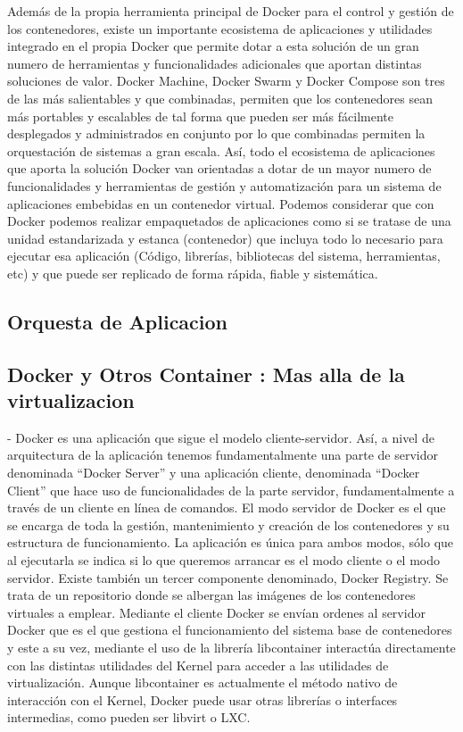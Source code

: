 \documentclass[%
 reprint,
 amsmath,amssymb,
 aps,
]{revtex4-1}
\begin{document}
Además de la propia herramienta principal de Docker para el control y gestión de los
contenedores, existe un importante ecosistema de aplicaciones y utilidades integrado en el propia
Docker que permite dotar a esta solución de un gran numero de herramientas y funcionalidades
adicionales que aportan distintas soluciones de valor. Docker Machine, Docker Swarm y Docker
Compose son tres de las más salientables y que combinadas, permiten que los contenedores
sean más portables y escalables de tal forma que pueden ser más fácilmente desplegados y
administrados en conjunto por lo que combinadas permiten la orquestación de sistemas a gran
escala. Así, todo el ecosistema de aplicaciones que aporta la solución Docker van orientadas a
dotar de un mayor numero de funcionalidades y herramientas de gestión y automatización para un
sistema de aplicaciones embebidas en un contenedor virtual.
Podemos considerar que con Docker podemos realizar empaquetados de aplicaciones como si se
tratase de una unidad estandarizada y estanca (contenedor) que incluya todo lo necesario para
ejecutar esa aplicación (Código, librerías, bibliotecas del sistema, herramientas, etc) y que puede
ser replicado de forma rápida, fiable y sistemática.

\subsection{Orquesta de Aplicacion}

\subsection{Docker y Otros Container : Mas alla de la virtualizacion}
- Docker es una aplicación que sigue el modelo cliente-servidor. Así, a nivel de arquitectura de la
aplicación tenemos fundamentalmente una parte de servidor denominada “Docker Server” y una
aplicación cliente, denominada “Docker Client” que hace uso de funcionalidades de la parte
servidor, fundamentalmente a través de un cliente en línea de comandos. El modo servidor de
Docker es el que se encarga de toda la gestión, mantenimiento y creación de los contenedores y
su estructura de funcionamiento. La aplicación es única para ambos modos, sólo que al ejecutarla
se indica si lo que queremos arrancar es el modo cliente o el modo servidor.
Existe también un tercer componente denominado, Docker Registry. Se trata de un repositorio
donde se albergan las imágenes de los contenedores virtuales a emplear.
Mediante el cliente Docker se envían ordenes al servidor Docker que es el que gestiona el
funcionamiento del sistema base de contenedores y este a su vez, mediante el uso de la librería
libcontainer interactúa directamente con las distintas utilidades del Kernel para acceder a las
utilidades de virtualización. Aunque libcontainer es actualmente el método nativo de interacción
con el Kernel, Docker puede usar otras librerías o interfaces intermedias, como pueden ser libvirt o
LXC.
\end{document}
